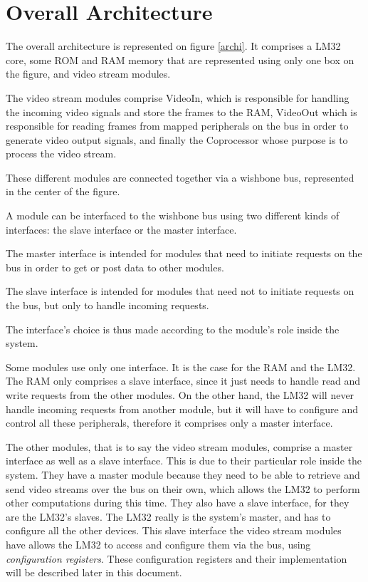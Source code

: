 
\section{Overall Architecture}

The overall architecture is represented on figure \ref{archi}.
It comprises a LM32 core, some ROM and RAM memory that are represented using only one box on the figure, and video stream modules.

The video stream modules comprise VideoIn, which is responsible for handling the incoming video signals and store the frames to the RAM, VideoOut which is responsible for reading frames from mapped peripherals on the bus in order to generate video output signals, and finally the Coprocessor whose purpose is to process the video stream.

These different modules are connected together via a wishbone bus, represented in the center of the figure.

A module can be interfaced to the wishbone bus using two different kinds of interfaces: the slave interface or the master interface.

The master interface is intended for modules that need to initiate requests on the bus in order to get or post data to other modules.

The slave interface is intended for modules that need not to initiate requests on the bus, but only to handle incoming requests.

The interface's choice is thus made according to the module's role inside the system.

Some modules use only one interface. It is the case for the RAM and the LM32. The RAM only comprises a slave interface, since it just needs to handle read and write requests from the other modules.
On the other hand, the LM32 will never handle incoming requests from another module, but it will have to configure and control all these peripherals, therefore it comprises only a master interface.

The other modules, that is to say the video stream modules, comprise a master interface as well as a slave interface.
This is due to their particular role inside the system. They have a master module because they need to be able to retrieve and send video streams over the bus on their own, which allows the LM32 to perform other computations during this time.
They also have a slave interface, for they are the LM32's slaves. The LM32 really is the system's master, and has to configure all the other devices.
This slave interface the video stream modules have allows the LM32 to access and configure them via the bus, using \emph{configuration registers}.
These configuration registers and their implementation will be described later in this document.


